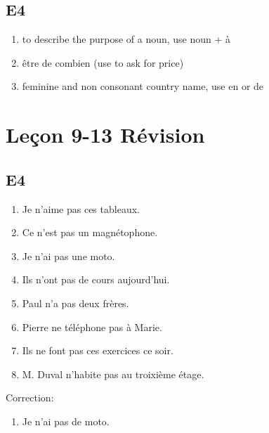 \documentclass{book}
\begin{document}
    \section{E4}
        \begin{enumerate}
            \item to describe the purpose of a noun, use noun + à
            \item être de combien (use to ask for price)
            \item feminine and non consonant country name, use en or de
        \end{enumerate}

\chapter{Leçon 9-13 Révision}

    \section{E4}
        \begin{enumerate}
            \item Je n'aime pas ces tableaux.
            \item Ce n'est pas un magnétophone.
            \item Je n'ai pas une moto.
            \item Ils n'ont pas de cours aujourd'hui.
            \item Paul n'a pas deux frères.
            \item Pierre ne téléphone pas à Marie.
            \item Ils ne font pas ces exercices ce soir.
            \item M. Duval n'habite pas au troixième étage.
        \end{enumerate}
        Correction:
        \begin{enumerate}
            \item Je n'ai pas de moto.
        \end{enumerate}
\end{document}
